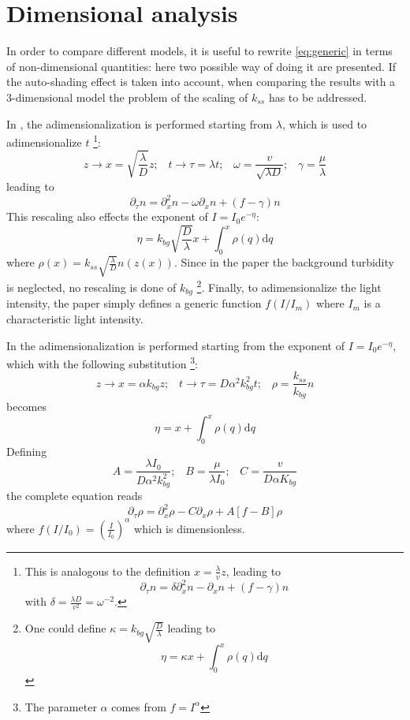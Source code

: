 \section{Dimensional analysis} \label{sec:adimensionalization}
In order to compare different models, it is useful to rewrite \autoref{eq:generic} in terms of non-dimensional quantities: here two possible way of doing it are presented. If the auto-shading effect is taken into account, when comparing the results with a 3-dimensional model the problem of the scaling of $k_{ss}$ has to be addressed.

In \autocite{Shigesada1981AnalysisWaters}, the adimensionalization is performed starting from $\lambda$, which is used to adimensionalize $t$
\footnote{This is analogous to the definition \(x=\frac{\lambda}{v}z\), leading to
\[ \partial_\tau n = \delta \partial_x^2 n - \partial_x n + (f - \gamma) n \]
with \( \delta = \frac{\lambda D}{v^2} = \omega^{-2}\). }:
\[ z \rightarrow x = \sqrt{\frac{\lambda}{D}} z ; \;\;\; t \rightarrow \tau = \lambda t ; \;\;\; \omega = \frac{v}{\sqrt{\lambda D}};
\;\;\; \gamma = \frac{\mu}{\lambda} \]
leading to
\[ \partial_\tau n = \partial_x^2 n - \omega\partial_x n + (f - \gamma) n \]
This rescaling also effects the exponent of $I = I_0 e^{-\eta}$: 
\[ \eta = k_{bg}\sqrt{\frac{D}{\lambda}}x + \int_0^x \rho(q) \mathrm{d}q  \]
where \( \rho(x) = k_{ss} \sqrt{\frac{\lambda}{D}} n(z(x)) \). Since in the paper the background turbidity is neglected, no rescaling is done of $k_{bg}$ \footnote{One could define \( \kappa = k_{bg} \sqrt{\frac{D}{\lambda}} \) leading to
\[  \eta = \kappa x + \int_0^x \rho(q) \mathrm{d}q  \]}.
Finally, to adimensionalize the light intensity, the paper simply defines a generic function $f(I/I_m)$ where $I_m$ is a characteristic light intensity.

In \autocite{Ebert2001CriticalBlooms} the adimensionalization is performed starting from the exponent of $I=I_0 e^{-\eta}$, which with the following substitution \footnote{The parameter $\alpha$ comes from \( f = I^\alpha \)}:
\[ z \rightarrow x= \alpha k_{bg} z ; \;\;\; t \rightarrow \tau = D \alpha^2 k_{bg}^2 t ; \;\;\; \rho = \frac{k_{ss}}{k_{bg}}n \]
becomes
\[ \eta = x + \int_0^x \rho(q) \mathrm{d}q \]
Defining
\[A = \frac{\lambda I_0}{D \alpha^2 k_{bg}^2} ;\;\;\; B = \frac{\mu}{\lambda I_0} ; \;\;\; C=\frac{v}{D \alpha K_{bg}} \]
the complete equation reads
\[ \partial_\tau \rho = \partial_x^2 \rho - C \partial_x\rho + A[ f - B ] \rho \]
where \( f(I/I_0) = \left(\frac{I}{I_0}\right)^\alpha \) which is dimensionless.



